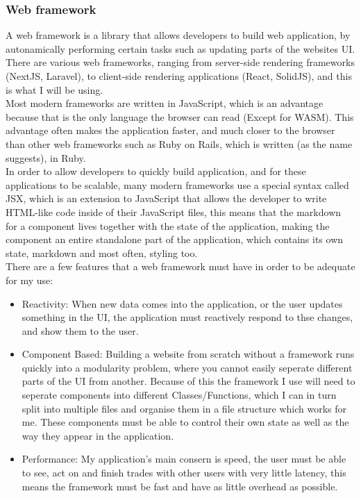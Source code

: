 \documentclass[titlepage]{article}
\begin{document}
\subsubsection{Web framework}
A web framework is a library that allows developers to build web application, by autonamically performing certain tasks such as updating parts of the websites UI. There are various web frameworks, ranging from server-side rendering frameworks (NextJS, Laravel), to client-side rendering applications (React, SolidJS), and this is what I will be using. \\

Most modern frameworks are written in JavaScript, which is an advantage because that is the only language the browser can read (Except for WASM). This advantage often makes the application faster, and much closer to the browser than other web frameworks such as Ruby on Rails, which is written (as the name suggests), in Ruby. \\

In order to allow developers to quickly build application, and for these applications to be scalable, many modern frameworks use a special syntax called JSX, which is an extension to JavaScript that allows the developer to write HTML-like code inside of their JavaScript files, this means that the markdown for a component lives together with the state of the application, making the component an entire standalone part of the application, which contains its own state, markdown and most often, styling too. \\

There are a few features that a web framework must have in order to be adequate for my use:
\begin{itemize}
  \item Reactivity: When new data comes into the application, or the user updates something in the UI, the application must reactively respond to thse changes, and show them to the user.
  \item Component Based: Building a website from scratch without a framework runs quickly into a modularity problem, where you cannot easily seperate different parts of the UI from another. Because of this the framework I use will need to seperate components into different Classes/Functions, which I can in turn split into multiple files and organise them in a file structure which works for me. These components must be able to control their own state as well as the way they appear in the application.
  \item Performance: My application's main consern is speed, the user must be able to see, act on and finish trades with other users with very little latency, this means the framework must be fast and have as little overhead as possible.
\end{itemize}
\end{document}

